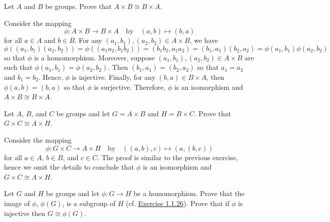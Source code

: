 \begin{exercise}\label{ex1.6.11}
    Let $A$ and $B$ be groups. Prove that $A \times B \cong B \times A$.
\end{exercise}

\begin{sol}
    Consider the mapping
    \[\phi : A \times B \to B \times A \quad \text{by} \quad (a, b) \mapsto (b, a)\]
    for all $a \in A$ and $b \in B$. For any $(a_1, b_1), (a_2, b_2) \in A \times B$, we have
    \[\phi((a_1, b_1)(a_2, b_2)) = \phi((a_1a_2, b_1b_2)) = (b_1b_2, a_1a_2) = (b_1, a_1)(b_2, a_2) = \phi(a_1, b_1)\phi(a_2, b_2)\]
    so that $\phi$ is a homomorphism. Moreover, suppose $(a_1, b_1), (a_2, b_2) \in A \times B$ are such that $\phi(a_1, b_1) = \phi(a_2, b_2)$. Then $(b_1, a_1) = (b_2, a_2)$ so that $a_1 = a_2$ and $b_1 = b_2$. Hence, $\phi$ is injective. Finally, for any $(b, a) \in B \times A$, then $\phi(a, b) = (b, a)$ so that $\phi$ is surjective. Therefore, $\phi$ is an isomorphism and $A \times B \cong B \times A$.
\end{sol}

\begin{exercise}\label{ex1.6.12}
    Let $A$, $B$, and $C$ be groups and let $G = A \times B$ and $H = B \times C$. Prove that $G \times C \cong A \times H$.
\end{exercise}

\begin{sol}
    Consider the mapping
    \[\phi : G \times C \to A \times H \quad \text{by} \quad ((a, b), c) \mapsto (a, (b, c))\]
    for all $a \in A$, $b \in B$, and $c \in C$. The proof is similar to the previous exercise, hence we omit the details to conclude that $\phi$ is an isomorphism and $G \times C \cong A \times H$.
\end{sol}

\begin{specialexercise} \label{ex1.6.13}
    Let $G$ and $H$ be groups and let $\phi : G \to H$ be a homomorphism. Prove that the image of $\phi$, $\phi(G)$, is a subgroup of $H$ (cf. \hyperref[ex1.1.26]{Exercise 1.1.26}). Prove that if $\phi$ is injective then $G \cong \phi(G)$.
\end{specialexercise}

